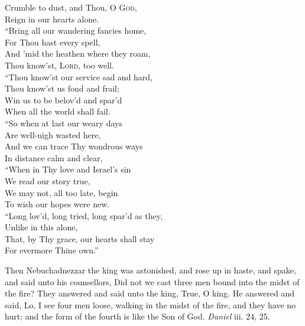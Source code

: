  Crumble to dust, and Thou, O \textsc{God}, \\
 Reign in our hearts alone. \\
  “Bring all our wandering fancies home, \\
 For Thou hast every spell, \\
 And ’mid the heathen where they roam, \\
 Thou know’st, \textsc{Lord}, too well. \\
  “Thou know’st our service sad and hard, \\
 Thou know’st us fond and frail; \\
 Win us to be belov’d and spar’d \\
 When all the world shall fail. \\
  “So when at last our weary days \\
 Are well-nigh wasted here, \\
 And we can trace Thy wondrous ways \\
 In distance calm and clear, \\
  “When in Thy love and Israel’s sin \\
 We read our story true, \\
 We may not, all too late, begin \\
 To wish our hopes were new. \\
  “Long lov’d, long tried, long spar’d as they, \\
 Unlike in this alone, \\
 That, by Thy grace, our hearts shall stay \\
 For evermore Thine own.”\\


Then Nebuchadnezzar the king was astonished, and rose up in haste, and spake, and said unto his counsellors, Did not we cast three men bound into the midst of the fire? They answered and said unto the king, True, O king. He answered and said, Lo, I see four men loose, walking in the midst of the fire, and they have no hurt; and the form of the fourth is like the Son of God. \emph{Daniel} iii. 24, 25.

